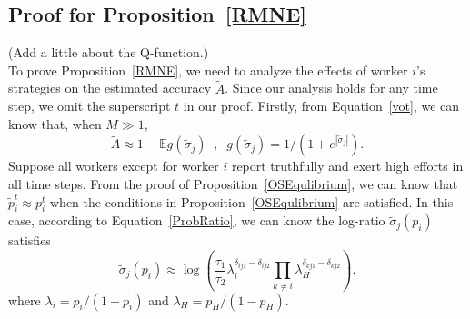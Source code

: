 \documentclass{article}
\begin{document}
\subsection{Proof for Proposition~\ref{RMNE}}
{\color{red}(Add a little about the Q-function.)}\\
To prove Proposition~\ref{RMNE}, we need to analyze the effects of worker $i$'s strategies on the estimated accuracy $\tilde{A}$.
Since our analysis holds for any time step, we omit the superscript $t$ in our proof.
Firstly, from Equation~\ref{vot}, we can know that, when $M\gg 1$,
\begin{equation}
\label{accP}
\tilde{A} \approx 1-\mathbb{E}g(\tilde{\sigma}_j)\;\;,\;\; g(\tilde{\sigma}_j)=1/(1+e^{|\tilde{\sigma}_j|}).
\end{equation}
Suppose all workers except for worker $i$ report truthfully and exert high efforts in all time steps.
From the proof of Proposition~\ref{OSEqulibrium}, we can know that $\tilde{p}^{t}_i \approx p^{t}_i$ when the conditions in Proposition~\ref{OSEqulibrium} are satisfied.
In this case, according to Equation~\ref{ProbRatio}, we can know the log-ratio $\tilde{\sigma}_j(p_i)$ satisfies
\begin{equation}
\label{ProbRatioApp}
\tilde{\sigma}_j(p_i)\approx \log\left(\frac{\tau_{1}}{\tau_{2}}\lambda_i^{\delta_{ij1}-\delta_{ij2}}{\prod}_{k\neq i}\lambda_H^{\delta_{kj1}-\delta_{kj2}}\right).
\end{equation}
where $\lambda_i=p_i/(1-p_i)$ and $\lambda_H=p_H/(1-p_H)$.
\end{document}
